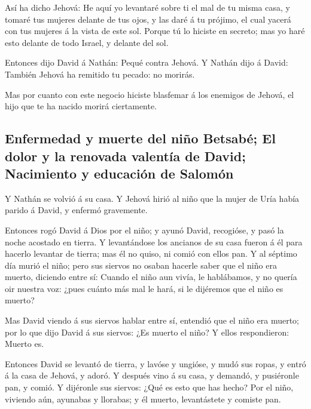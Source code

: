  Así ha dicho Jehová: He aquí yo levantaré sobre ti el mal
de tu misma casa, y tomaré tus mujeres delante de tus ojos, y las daré á
tu prójimo, el cual yacerá con tus mujeres á la vista de este sol.
 Porque tú lo hiciste en secreto; mas yo haré esto delante
de todo Israel, y delante del sol.

 Entonces dijo David á Nathán: Pequé contra Jehová. Y
Nathán dijo á David: También Jehová ha remitido tu pecado: no morirás.

 Mas por cuanto con este negocio hiciste blasfemar á los
enemigos de Jehová, el hijo que te ha nacido morirá ciertamente.

\hypertarget{enfermedad-y-muerte-del-niuxf1o-betsabuxe9-el-dolor-y-la-renovada-valentuxeda-de-david-nacimiento-y-educaciuxf3n-de-salomuxf3n}{%
\subsection{Enfermedad y muerte del niño Betsabé; El dolor y la renovada
valentía de David; Nacimiento y educación de
Salomón}\label{enfermedad-y-muerte-del-niuxf1o-betsabuxe9-el-dolor-y-la-renovada-valentuxeda-de-david-nacimiento-y-educaciuxf3n-de-salomuxf3n}}

 Y Nathán se volvió á su casa. Y Jehová hirió al niño que
la mujer de Uría había parido á David, y enfermó gravemente.

 Entonces rogó David á Dios por el niño; y ayunó David,
recogióse, y pasó la noche acostado en tierra.  Y
levantándose los ancianos de su casa fueron á él para hacerlo levantar
de tierra; mas él no quiso, ni comió con ellos pan.  Y al
séptimo día murió el niño; pero sus siervos no osaban hacerle saber que
el niño era muerto, diciendo entre sí: Cuando el niño aun vivía, le
hablábamos, y no quería oir nuestra voz: ¿pues cuánto más mal le hará,
si le dijéremos que el niño es muerto?

 Mas David viendo á sus siervos hablar entre sí, entendió
que el niño era muerto; por lo que dijo David á sus siervos: ¿Es muerto
el niño? Y ellos respondieron: Muerto es.

 Entonces David se levantó de tierra, y lavóse y ungióse, y
mudó sus ropas, y entró á la casa de Jehová, y adoró. Y después vino á
su casa, y demandó, y pusiéronle pan, y comió.  Y dijéronle
sus siervos: ¿Qué es esto que has hecho? Por el niño, viviendo aún,
ayunabas y llorabas; y él muerto, levantástete y comiste pan.

